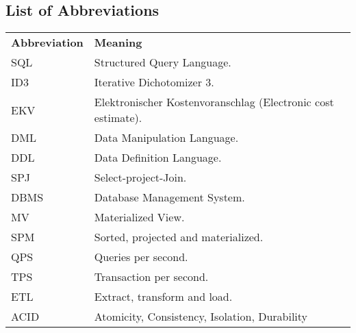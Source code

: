 
% 

\begin{center}
    \section*{List of Abbreviations}
\end{center}

\noindent %
\begin{minipage}{\textwidth}
\begin{tabular}{ll}
    \textbf{Abbreviation} & \textbf{Meaning} \\
    SQL & Structured Query Language. \\
    ID3 & Iterative  Dichotomizer 3. \\
    EKV & Elektronischer Kostenvoranschlag (Electronic cost estimate).\\
    DML & Data Manipulation Language. \\
    DDL & Data Definition Language.\\
    SPJ & Select-project-Join.\\
    DBMS & Database Management System.\\
    MV & Materialized View.\\
    SPM & Sorted, projected and materialized.\\
    QPS & Queries per second.\\
    TPS & Transaction per second.\\
    ETL & Extract, transform and load. \\
    ACID & Atomicity, Consistency, Isolation, Durability\\
\end{tabular}
\end{minipage}
% 

    